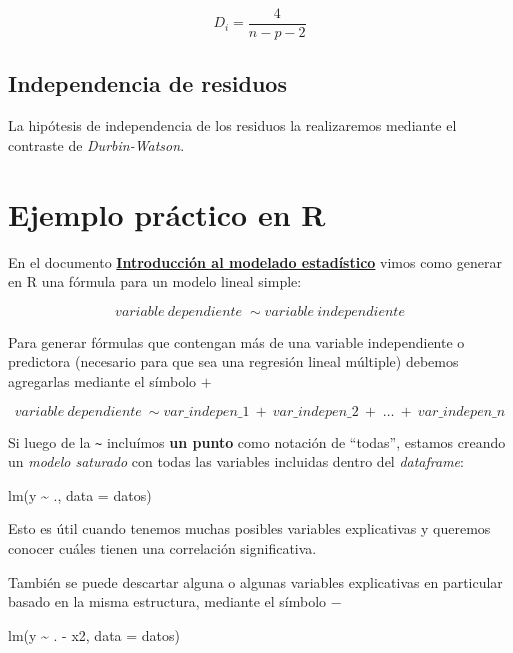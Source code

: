 \documentclass[
  spanish,
  a4paper,
]{scrbook}
\newenvironment{Shaded}{\begin{snugshade}}{\end{snugshade}}
\newcommand{\AttributeTok}[1]{\textcolor[rgb]{0.40,0.45,0.13}{#1}}
\newcommand{\FunctionTok}[1]{\textcolor[rgb]{0.28,0.35,0.67}{#1}}
\newcommand{\NormalTok}[1]{\textcolor[rgb]{0.00,0.23,0.31}{#1}}
\newcommand{\SpecialCharTok}[1]{\textcolor[rgb]{0.37,0.37,0.37}{#1}}
\begin{document}
\[ 
D_i=\frac{4}{n-p-2}  
\]

\subsection{Independencia de residuos}\label{independencia-de-residuos}

La hipótesis de independencia de los residuos la realizaremos mediante
el contraste de \emph{Durbin-Watson}.

\section{Ejemplo práctico en R}\label{ejemplo-pruxe1ctico-en-r-7}

En el documento
\hyperref[introducciuxf3n-al-modelado-estaduxedstico]{\textbf{Introducción
al modelado estadístico}} vimos como generar en R una fórmula para un
modelo lineal simple:

\[ 
variable \ dependiente \; \sim variable  \ independiente 
\]

Para generar fórmulas que contengan más de una variable independiente o
predictora (necesario para que sea una regresión lineal múltiple)
debemos agregarlas mediante el símbolo \(+\)

\[ 
variable \ dependiente \ \sim var\_indepen\_1 \ + \ var\_indepen\_2 \ + \; \dots \ + \ var\_indepen\_n 
\]

Si luego de la \texttt{\textasciitilde{}} incluímos \textbf{un punto}
como notación de ``todas'', estamos creando un \emph{modelo saturado}
con todas las variables incluidas dentro del \emph{dataframe}:

\begin{Shaded}
\begin{Highlighting}[]
\FunctionTok{lm}\NormalTok{(y }\SpecialCharTok{\textasciitilde{}}\NormalTok{ ., }\AttributeTok{data =}\NormalTok{ datos)}
\end{Highlighting}
\end{Shaded}

Esto es útil cuando tenemos muchas posibles variables explicativas y
queremos conocer cuáles tienen una correlación significativa.

También se puede descartar alguna o algunas variables explicativas en
particular basado en la misma estructura, mediante el símbolo \(-\)

\begin{Shaded}
\begin{Highlighting}[]
\FunctionTok{lm}\NormalTok{(y }\SpecialCharTok{\textasciitilde{}}\NormalTok{ . }\SpecialCharTok{{-}}\NormalTok{ x2, }\AttributeTok{data =}\NormalTok{ datos)}
\end{Highlighting}
\end{Shaded}
\end{document}
